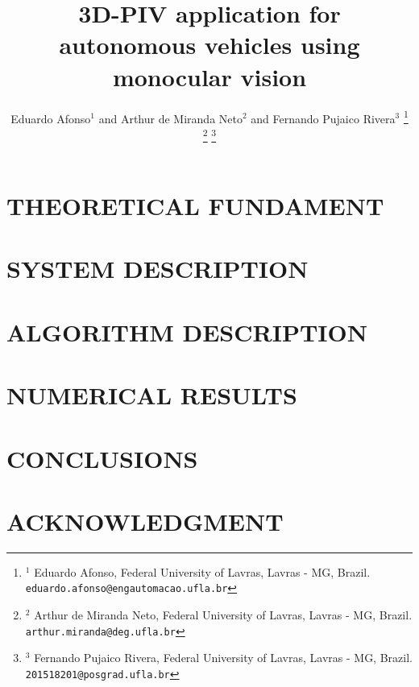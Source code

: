 \documentclass[letterpaper, 10 pt,conference]{ieeeconf}  %
\title{\LARGE \bf
3D-PIV application for autonomous vehicles using monocular vision
}
\author{Eduardo Afonso$^{1}$ and Arthur de Miranda Neto$^{2}$ and Fernando Pujaico Rivera$^{3}$%
\thanks{$^{1}$ Eduardo Afonso, Federal University of Lavras, Lavras - MG, Brazil.
        {\tt\small eduardo.afonso@engautomacao.ufla.br}}%
\thanks{$^{2}$ Arthur de Miranda Neto, Federal University of Lavras, Lavras - MG, Brazil.
        {\tt\small arthur.miranda@deg.ufla.br}}%
\thanks{$^{3}$ Fernando Pujaico Rivera, Federal University of Lavras, Lavras - MG, Brazil.
        {\tt\small 201518201@posgrad.ufla.br}}%
}
\begin{document}
\maketitle
\thispagestyle{empty}
\pagestyle{empty}

\begin{abstract}



\end{abstract}



\section{THEORETICAL FUNDAMENT}




\section{SYSTEM DESCRIPTION}


\section{ALGORITHM DESCRIPTION}
 




\section{NUMERICAL RESULTS}


\section{CONCLUSIONS}

\addtolength{\textheight}{-12cm}

\section*{ACKNOWLEDGMENT}



\end{document}
